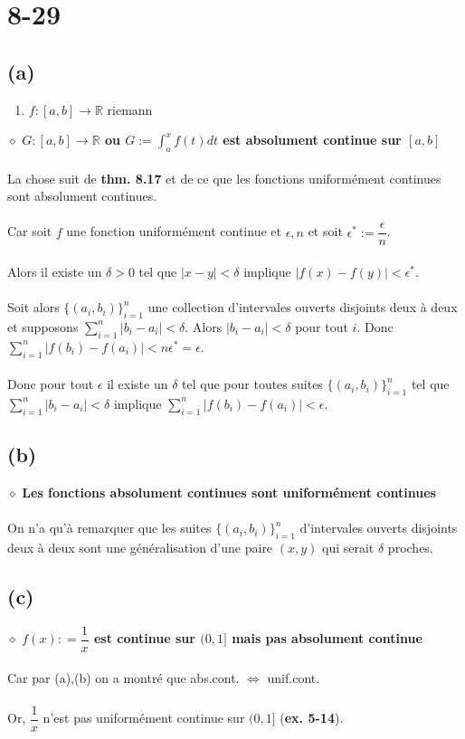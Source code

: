 \documentclass[a4paper,10pt]{article}
\begin{document}
\section*{8-29}
\subsection*{(a)}
\begin{enumerate}
 \item $f : [a,b] \rightarrow \mathbb{R}$ riemann
\end{enumerate}
$\diamond$ \textbf{$G : [a,b] \rightarrow \mathbb{R}$ ou $G:=\int_a^x f(t)dt$ est absolument continue sur $[a,b]$}
\\
\\
La chose suit de \textbf{thm. 8.17} et de ce que les fonctions uniformément continues sont absolument continues.
\\
\\
Car soit $f$ une fonction uniformément continue et $\epsilon, n$ et soit $\epsilon^* := \dfrac{\epsilon}{n}$. 
\\
\\
Alors il existe un $\delta > 0$ tel que $|x-y| < \delta$ implique $|f(x) - f(y)| < \epsilon^*$. 
\\
\\
Soit alors $\{(a_i,b_i)\}_{i=1}^n$ une collection d'intervales ouverts disjoints deux à deux et supposons
$\sum_{i=1}^n |b_i - a_i| < \delta$. Alors $|b_i - a_i| < \delta$ pour tout $i$. Donc $\sum_{i=1}^n |f(b_i) - f(a_i)| < n\epsilon^* = \epsilon$.
\\
\\
Donc pour tout $\epsilon$ il existe un $\delta$ tel que pour toutes suites $\{(a_i,b_i)\}_{i=1}^n$ tel que $\sum_{i=1}^n |b_i - a_i| < \delta$ implique
$\sum_{i=1}^n |f(b_i) - f(a_i)| < \epsilon$.

\subsection*{(b)}
$\diamond$ \textbf{Les fonctions absolument continues sont uniformément continues}
\\
\\
On n'a qu'à remarquer que les suites $\{(a_i, b_i)\}_{i=1}^n$ d'intervales ouverts disjoints deux à deux sont une généralisation
d'une paire $(x,y)$ qui serait $\delta$ proches.

\subsection*{(c)}
$\diamond$ \textbf{$f(x) : =  \dfrac{1}{x}$ est continue sur $(0,1]$ mais pas absolument continue}
\\
\\
Car par (a),(b) on a montré que abs.cont. $\Leftrightarrow$ unif.cont.
\\
\\
Or, $\dfrac{1}{x}$ n'est pas uniformément continue sur $(0,1]$ (\textbf{ex. 5-14}).
\end{document}
